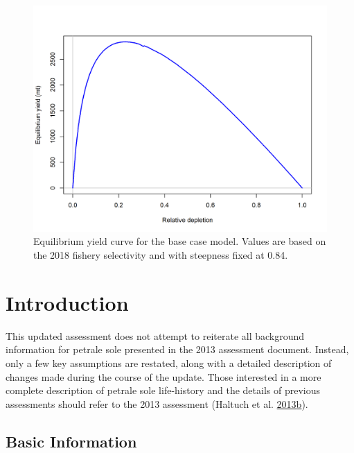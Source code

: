\documentclass[12pt,]{article}
\begin{document}
\FloatBarrier

\begin{figure}
\centering
\includegraphics{r4ss/plots_mod1/yield1_yield_curve.png}
\caption{Equilibrium yield curve for the base case model. Values are
based on the 2018 fishery selectivity and with steepness fixed at 0.84.
\label{fig:Yield_all}}
\end{figure}

\FloatBarrier

\newpage

\renewcommand{\thefigure}{\arabic{figure}}
\renewcommand{\thetable}{\arabic{table}}

\setcounter{figure}{0} \setcounter{table}{0}


\section{Introduction}\label{introduction}

This updated assessment does not attempt to reiterate all background
information for petrale sole presented in the 2013 assessment document.
Instead, only a few key assumptions are restated, along with a detailed
description of changes made during the course of the update. Those
interested in a more complete description of petrale sole life-history
and the details of previous assessments should refer to the 2013
assessment (Haltuch et al.
\protect\hyperlink{ref-haltuch_status_2013}{2013}\protect\hyperlink{ref-haltuch_status_2013}{b}).

\subsection{Basic Information}\label{basic-information}
\end{document}
